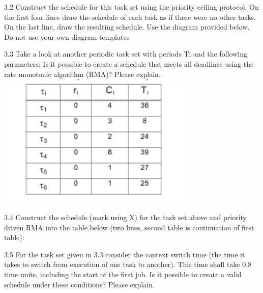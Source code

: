 3.2  Construct the schedule for this task set using the priority ceiling protocol. On the first
four lines draw the schedule of each task as if there were no other tasks. On the last
line, draw the resulting schedule. Use the diagram provided below. Do not use your own
diagram templates


3.3 Take a look at another periodic task set with periods Ti and the following parameters:
Is it possible to create a schedule that meets all deadlines using the rate monotonic
algorithm (RMA)? Please explain.
\includegraphics[width=0.7\textwidth]{master-exam-2009/2009_RMA}


3.4  Construct the schedule (mark using X) for the task set above and priority driven RMA into
the table below (two lines, second table is continuation of first table):

3.5 For the task set given in 3.3 consider the context switch time (the time it takes to
switch from execution of one task to another). This time shall take 0.8 time units, including
the start of the first job. Is it possible to create a valid schedule under these conditions?
Please explain.



